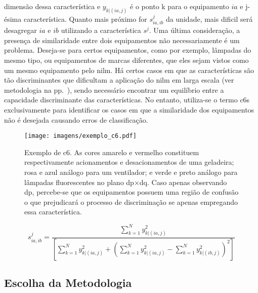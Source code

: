 \begin{itemize}
dimensão dessa característica e $y_{k|(ia,j)}$ é o ponto k para o
equipamento $ia$ e j-ésima característica. Quanto mais próximo for
$s^j_{ia,ib}$ da unidade, mais dificil será desagregar $ia$ e $ib$
utilizando a característica $s^j$. Uma última consideração, a presença
de similaridade entre dois equipamentos não necessariamente é um
problema. Deseja-se para certos equipamentos, como por exemplo, lâmpadas
do mesmo tipo, ou equipamentos de marcas diferentes, que eles sejam
vistos como um mesmo equipamento pelo \gls{nilm}. Há certos casos em
que as características são tão discriminantes que dificultam a
aplicação do \gls{nilm} em larga escala (ver metodologia na
pp.~\pageref{nilm:emi}), sendo necessário encontrar um equilíbrio entre
a capacidade discriminante das características. No entanto, utiliza-se
o termo \glspl{c6} exclusivamente para identificar os casos em que a
similaridade dos equipamentos não é desejada causando erros de
classificação.
\end{itemize}

\begin{figure}[h!t]
\centering
\texttt{[image: imagens/exemplo\_c6.pdf]}
\caption[Exemplo de \acrfull{c6}]
{Exemplo de \acrfull{c6}. As cores amarelo e vermelho constituem
respectivamente acionamentos e desacionamentos de uma geladeira; rosa
e azul análogo para um ventilador; e verde e preto análogo para
lâmpadas fluorescentes no plano \acs{dp}$\times$\acs{dq}. Caso apenas 
observando \acs{dp}, percebe-se que os equipamentos possuem uma região
de confusão o que prejudicará o processo de discriminação se apenas
empregando essa característica.}
\label{fig:exemplo_c6}
\end{figure}

\begin{equation}\label{eq:similaridade}
s^j_{ia,ib} = \dfrac{
\sum^N_{k=1}y^2_{k|(ia,j)}}{
\left[\sum^N_{k=1}y^2_{k|(ia,j)} + \left(
\sum^N_{k=1}y^2_{k|(ia,j)} - \sum^N_{k=1}y^2_{k|(ib,j)}
\right)^2
\right]
}
\end{equation}

\subsection{Escolha da Metodologia}
\label{ssec:metodologia_generica}

